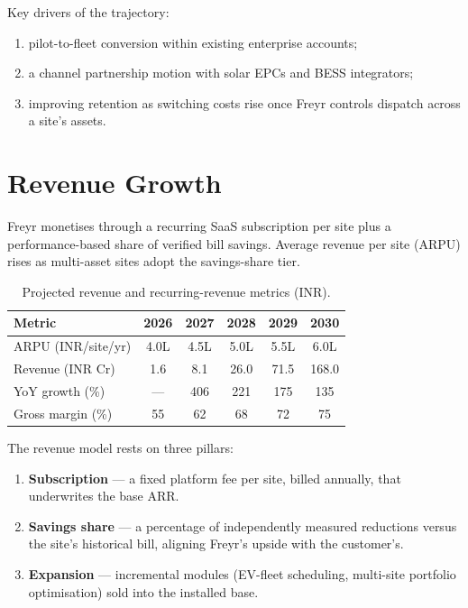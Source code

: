 \documentclass[journal,article,submit,moreauthors]{Definitions/mdpi}
\begin{document}
Key drivers of the trajectory:

\begin{enumerate}
	\item pilot-to-fleet conversion within existing enterprise accounts;
	\item a channel partnership motion with solar EPCs and BESS integrators;
	\item improving retention as switching costs rise once Freyr controls
	      dispatch across a site's assets.
\end{enumerate}

\section{Revenue Growth}\label{sec:revenue}

Freyr monetises through a recurring SaaS subscription per site plus a
performance-based share of verified bill savings. Average revenue per site
(ARPU) rises as multi-asset sites adopt the savings-share tier.

\begin{table}[H]
	\caption{Projected revenue and recurring-revenue metrics (INR).}
	\label{tab:revenue}
	\begin{tabularx}{\textwidth}{lCCCCC}
		\toprule
		\textbf{Metric} & \textbf{2026} & \textbf{2027} & \textbf{2028}
		& \textbf{2029} & \textbf{2030} \\
		\midrule
		ARPU (INR/site/yr) & 4.0L & 4.5L & 5.0L & 5.5L & 6.0L \\
		Revenue (INR Cr)   & 1.6  & 8.1  & 26.0 & 71.5 & 168.0 \\
		YoY growth (\%)    & ---  & 406  & 221  & 175  & 135 \\
		Gross margin (\%)  & 55   & 62   & 68   & 72   & 75 \\
		\bottomrule
	\end{tabularx}
\end{table}

The revenue model rests on three pillars:

\begin{enumerate}
	\item \textbf{Subscription} --- a fixed platform fee per site, billed
	      annually, that underwrites the base ARR.
	\item \textbf{Savings share} --- a percentage of independently measured
	      reductions versus the site's historical bill, aligning Freyr's upside
	      with the customer's.
	\item \textbf{Expansion} --- incremental modules (EV-fleet scheduling,
	      multi-site portfolio optimisation) sold into the installed base.
\end{enumerate}
\end{document}
